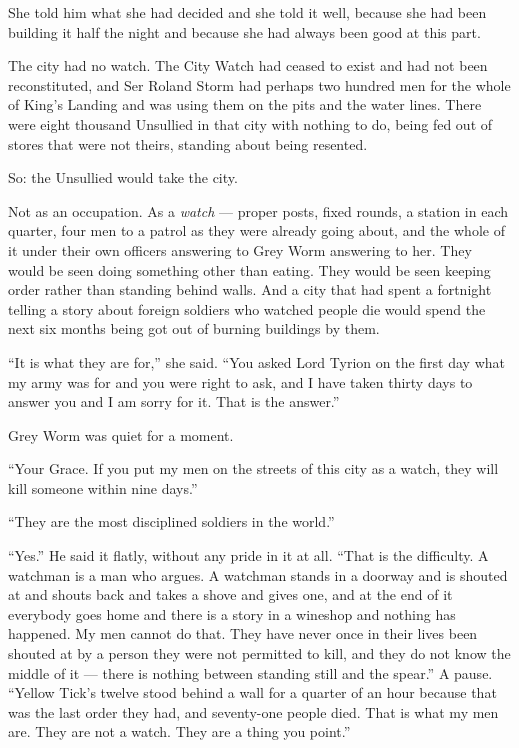 \sceneBreak

She told him what she had decided and she told it well, because she had been building it half the night and because she had always been good at this part.

The city had no watch. The City Watch had ceased to exist and had not been reconstituted, and Ser Roland Storm had perhaps two hundred men for the whole of King’s Landing and was using them on the pits and the water lines. There were eight thousand Unsullied in that city with nothing to do, being fed out of stores that were not theirs, standing about being resented.

So: the Unsullied would take the city.

Not as an occupation. As a \textit{watch} — proper posts, fixed rounds, a station in each quarter, four men to a patrol as they were already going about, and the whole of it under their own officers answering to Grey Worm answering to her. They would be seen doing something other than eating. They would be seen keeping order rather than standing behind walls. And a city that had spent a fortnight telling a story about foreign soldiers who watched people die would spend the next six months being got out of burning buildings by them.

“It is what they are for,” she said. “You asked Lord Tyrion on the first day what my army was for and you were right to ask, and I have taken thirty days to answer you and I am sorry for it. That is the answer.”

Grey Worm was quiet for a moment.

“Your Grace. If you put my men on the streets of this city as a watch, they will kill someone within nine days.”

“They are the most disciplined soldiers in the world.”

“Yes.” He said it flatly, without any pride in it at all. “That is the difficulty. A watchman is a man who argues. A watchman stands in a doorway and is shouted at and shouts back and takes a shove and gives one, and at the end of it everybody goes home and there is a story in a wineshop and nothing has happened. My men cannot do that. They have never once in their lives been shouted at by a person they were not permitted to kill, and they do not know the middle of it — there is nothing between standing still and the spear.” A pause. “Yellow Tick’s twelve stood behind a wall for a quarter of an hour because that was the last order they had, and seventy-one people died. That is what my men are. They are not a watch. They are a thing you point.”

